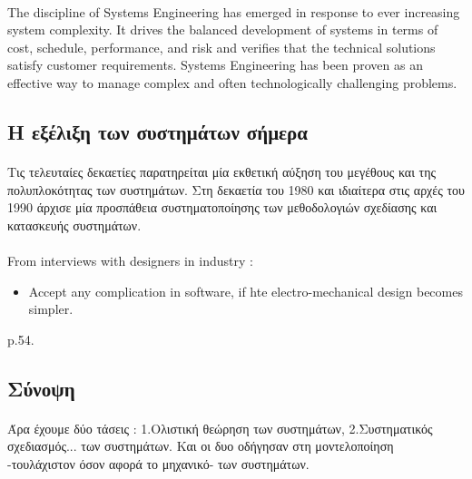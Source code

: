 \documentclass[a4paper,12pt,twoside]{report}
\begin{document}
{			\paragraph{} {The discipline of Systems Engineering has emerged in response to ever increasing system complexity. It drives the balanced development of systems in terms of cost, schedule, performance, and risk and verifies that the technical solutions satisfy customer requirements. Systems Engineering has been proven as an effective way to manage complex and often technologically challenging problems. \cite{MBSESystemArchitectureNavalShipDesign}
			}

		\subsection{Η εξέλιξη των συστημάτων σήμερα}
			\paragraph{} {Τις τελευταίες δεκαετίες παρατηρείται μία εκθετική αύξηση του μεγέθους και της πολυπλοκότητας των συστημάτων.  Στη δεκαετία του 1980 και ιδιαίτερα στις αρχές του 1990 άρχισε μία προσπάθεια συστηματοποίησης των μεθοδολογιών σχεδίασης και κατασκευής συστημάτων. \cite{FoundationalConceptsMDSD}
			}
			\paragraph{} {From interviews with designers  in industry :
			\begin{itemize}
			\item Accept any complication in software, if hte electro-mechanical design becomes simpler.
			\end{itemize}
			\cite{ATheoreticalApproachOnMechatronicsDesign:Buur1990} p.54.
			}
			
		\subsection{Σύνοψη}	
		
			\paragraph{}{Άρα έχουμε δύο τάσεις : 1.Ολιστική θεώρηση των συστημάτων, 2.Συστηματικός σχεδιασμός... των συστημάτων. Και οι δυο οδήγησαν στη μοντελοποίηση -τουλάχιστον όσον αφορά το μηχανικό- των συστημάτων.
			}
}
\end{document}
